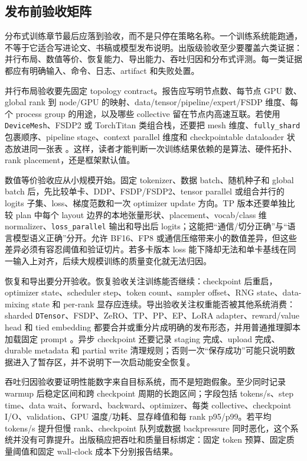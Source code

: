 \documentclass[UTF8,zihao=-4,openany]{ctexbook}
\begin{document}
\subsection{发布前验收矩阵}
分布式训练章节最后应落到验收，而不是只停在策略名称。一个训练系统能跑通，不等于它适合写进论文、书稿或模型发布说明。出版级验收至少要覆盖六类证据：并行布局、数值等价、恢复能力、导出能力、吞吐归因和分布式评测。每一类证据都应有明确输入、命令、日志、artifact 和失败处置。

并行布局验收要先固定 topology contract。报告应写明节点数、每节点 GPU 数、global rank 到 node/GPU 的映射、data/tensor/pipeline/expert/FSDP 维度、每个 process group 的用途，以及哪些 collective 留在节点内高速互联。若使用 \texttt{DeviceMesh}、FSDP2 或 TorchTitan 类组合栈，还要把 mesh 维度、\texttt{fully\_shard} 包裹顺序、pipeline stage、context parallel 维度和 checkpointable dataloader 状态放进同一张表 \cite{pytorch2026fsdp2,pytorch2026torchtitan}。这样，读者才能判断一次训练结果依赖的是算法、硬件拓扑、rank placement，还是框架默认值。

数值等价验收应从小规模开始。固定 tokenizer、数据 batch、随机种子和 global batch 后，先比较单卡、DDP、FSDP/FSDP2、tensor parallel 或组合并行的 logits 子集、loss、梯度范数和一次 optimizer update 方向。TP 版本还要单独比较 plan 中每个 layout 边界的本地张量形状、placement、vocab/class 维 normalizer、\texttt{loss\_parallel} 输出和导出后 logits；这能把“通信/切分正确”与“语言模型语义正确”分开。允许 BF16、FP8 或通信压缩带来小的数值差异，但这些差异必须有容忍阈值和验证切片。若多卡版本 loss 能下降却无法和单卡基线在同一输入上对齐，后续大规模训练的质量变化就无法归因。

恢复和导出要分开验收。恢复验收关注训练能否继续：checkpoint 后重启，optimizer state、scheduler step、token count、sampler offset、RNG state、data-mixing state 和 per-rank 显存应连续。导出验收关注权重能否被其他系统消费：sharded \texttt{DTensor}、FSDP、ZeRO、TP、PP、EP、LoRA adapter、reward/value head 和 tied embedding 都要合并或重分片成明确的发布形态，并用普通推理脚本加载固定 prompt \cite{pytorch2026distributedcheckpoint}。异步 checkpoint 还要记录 staging 完成、upload 完成、durable metadata 和 partial write 清理规则；否则一次“保存成功”可能只说明数据进入了暂存区，并不说明下一次启动能安全恢复。

吞吐归因验收要证明性能数字来自目标系统，而不是短跑假象。至少同时记录 warmup 后稳定区间和跨 checkpoint 周期的长跑区间；字段包括 tokens/s、step time、data wait、forward、backward、optimizer、每类 collective、checkpoint I/O、validation、GPU 温度/功耗、显存峰值和每 rank p95/p99。若平均 tokens/s 提升但慢 rank、checkpoint 队列或数据 backpressure 同时恶化，这个系统并没有可靠提升。出版稿应把吞吐和质量目标绑定：固定 token 预算、固定质量阈值和固定 wall-clock 成本下分别报告结果。
\end{document}
